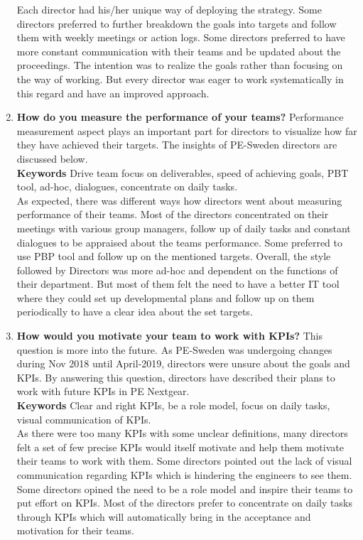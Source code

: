 \begin{enumerate}
Each director had his/her unique way of deploying the strategy. Some directors preferred to further breakdown the goals into targets and follow them with weekly meetings or action logs. Some directors preferred to have more constant communication with their teams and be updated about the proceedings. The intention was to realize the goals rather than focusing on the way of working. But every director was eager to work systematically in this regard and have an improved approach.\\

\item \textbf{How do you measure the performance of your teams?}
Performance measurement aspect plays an important part for directors to visualize how far they have achieved their targets. The insights of PE-Sweden directors are discussed below.\\

\textbf{Keywords} Drive team focus on deliverables, speed of achieving goals, PBT tool, ad-hoc, dialogues, concentrate on daily tasks.\\

As expected, there was different ways how directors went about measuring performance of their teams. Most of the directors concentrated on their meetings with various group managers, follow up of daily tasks and constant dialogues to be appraised about the teams performance. Some preferred to use PBP tool and follow up on the mentioned targets. Overall, the style followed by Directors was more ad-hoc and dependent on the functions of their department. But most of them felt the need to have a better IT tool where they could set up developmental plans and follow up on them periodically to have a clear idea about the set targets.\\

\item \textbf{How would you motivate your team to work with KPIs?}
This question is more into the future. As PE-Sweden was undergoing changes during Nov 2018 until April-2019, directors were unsure about the goals and KPIs. By answering this question, directors have described their plans to work with future KPIs in PE Nextgear.\\

\textbf{Keywords} Clear and right KPIs, be a role model, focus on daily tasks, visual communication of KPIs.\\

As there were too many KPIs with some unclear definitions, many directors felt a set of few precise KPIs would itself motivate and help them motivate their teams to work with them. Some directors pointed out the lack of visual communication regarding KPIs which is hindering the engineers to see them. Some directors opined the need to be a role model and inspire their teams to put effort on KPIs. Most of the directors prefer to concentrate on daily tasks through KPIs which will automatically bring in the acceptance and motivation for their teams.\\


\end{enumerate}
